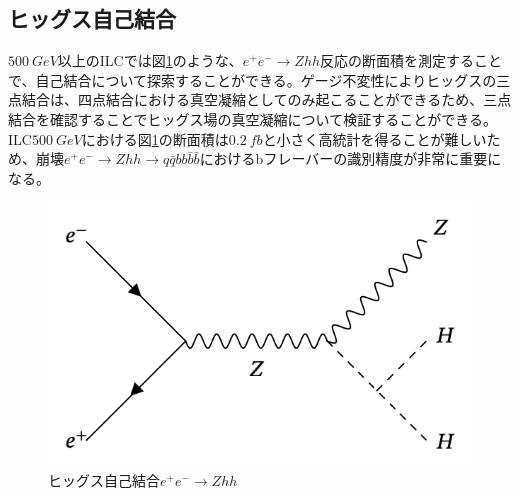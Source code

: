 \subsection{ヒッグス自己結合}
$\SI{500}{GeV}$以上のILCでは図\ref{selfcoupling}のような、$e^+e^- \rightarrow Zhh$反応の断面積を測定することで、自己結合について探索することができる。ゲージ不変性によりヒッグスの三点結合は、四点結合における真空凝縮としてのみ起こることができるため、三点結合を確認することでヒッグス場の真空凝縮について検証することができる。ILC$\SI{500}{GeV}$における図\ref{selfcoupling}の断面積は$\SI{0.2}{fb}$と小さく高統計を得ることが難しいため、崩壊$e^+e^- \rightarrow Zhh \rightarrow q\bar{q}bb\bar{b}\bar{b}$におけるbフレーバーの識別精度が非常に重要になる。
\begin{figure}[h]
	\begin{center}
 \includegraphics[keepaspectratio, scale=0.3]
 	{Figure/Introduction/selfcoupling.png}
 		\caption{ヒッグス自己結合$e^+e^- \rightarrow Zhh$}
 		\label{selfcoupling}
	\end{center}
\end{figure}
